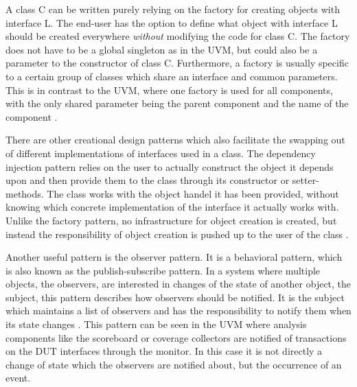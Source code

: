\documentclass[11pt]{report}
\begin{document}
A class C can be written purely relying on the factory for creating objects with interface L. The end-user has the
option to define what object with interface L should be created everywhere \textit{without} modifying the code for
class C. The factory does not have to be a global singleton as in the UVM, but could also be a parameter to the
constructor of class C. Furthermore, a factory is usually specific to a certain group of classes which share an
interface and common parameters. This is in contrast to the UVM, where one factory is used for all components, with
the only shared parameter being the parent component and the name of the component \cite[Ch. 3]{design_patterns}.

There are other creational design patterns which also facilitate the swapping out of different implementations of
interfaces used in a class. The dependency injection pattern relies on the user to actually construct the object it
depends upon and then provide them to the class through its constructor or setter-methods. The class works with the
object handel it has been provided, without knowing which concrete implementation of the interface it actually works
with. Unlike the factory pattern, no infrastructure for object creation is created, but instead the responsibility of
object creation is pushed up to the user of the class \cite{ioc_di}.

Another useful pattern is the observer pattern. It is a behavioral pattern, which is also known as the
publish-subscribe pattern. In a system where multiple objects, the observers, are interested in changes of the state
of another object, the subject, this pattern describes how observers should be notified. It is the subject which
maintains a list of observers and has the responsibility to notify them when its state changes \cite[Ch.
5]{design_patterns}. This pattern can be seen in the UVM where analysis components like the scoreboard or coverage
collectors are notified of transactions on the DUT interfaces through the monitor. In this case it is not directly a
change of state which the observers are notified about, but the occurrence of an event.

\begin{comment}

- factory pattern
- inversion of control \& dependency injection \cite{ioc_di}
- service locator pattern
  - kind of like factory, an object know how to create the right other objects, if global singleton it its kind of like factory
- strategy pattern
- observer pattern

- publish subscribe pattern
- actor pattern \cite{actors}

\end{comment}
\end{document}
